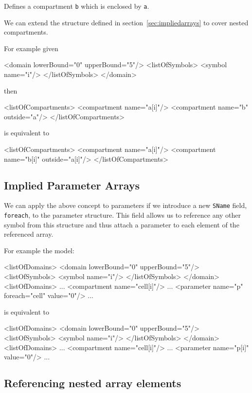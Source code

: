 \documentclass{cekarticle}
\begin{document}
Defines a compartment \texttt{b} which is enclosed by \texttt{a}.

We can extend the structure defined in section~\ref{sec:impliedarrays} to cover
nested compartments.

For example given

\begin{example}
<domain lowerBound="0" upperBound="5"/>
    <listOfSymbols>
        <symbol name="i"/>
    </listOfSymbols>
</domain>
\end{example}

then

\begin{example}
<listOfCompartments>
    <compartment name="a[i]"/>
    <compartment name="b" outside="a"/>
</listOfCompartments>
\end{example}

is equivalent to

\begin{example}
<listOfCompartments>
    <compartment name="a[i]"/>
    <compartment name="b[i]" outside="a[i]"/>
</listOfCompartments>
\end{example}

\subsection{Implied Parameter Arrays}

We can apply the above concept to parameters if we introduce a
new \texttt{SName} field, \texttt{foreach}, to the parameter
structure. This field allows us to reference any other symbol
from this structure and thus attach a parameter to each element
of the referenced array.

For example the model:
\begin{example}
<listOfDomains>
    <domain lowerBound="0" upperBound="5"/>
        <listOfSymbols>
            <symbol name="i"/>
        </listOfSymbols>
    </domain>
<listOfDomains>
...
<compartment name="cell[i]"/>
...
<parameter name="p" foreach="cell" value="0"/>
...
\end{example}
is equivalent to
\begin{example}
<listOfDomains>
    <domain lowerBound="0" upperBound="5"/>
        <listOfSymbols>
            <symbol name="i"/>
        </listOfSymbols>
    </domain>
<listOfDomains>
...
<compartment name="cell[i]"/>
...
<parameter name="p[i]" value="0"/>
...
\end{example}

\subsection{Referencing nested array elements}
\end{document}
